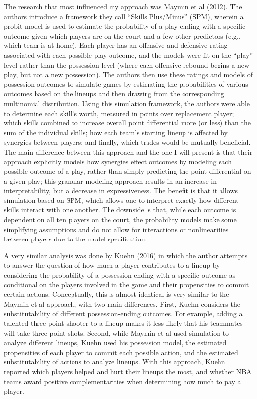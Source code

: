 The research that most influenced my approach was Maymin et al (2012). The authors
introduce a framework they call ``Skills Plus/Minus'' (SPM), wherein a probit model
is used to estimate the probability of a play ending with a specific outcome given
which players are on the court and a few other predictors (e.g., which team is at
home). Each player has an offensive and defensive rating associated with each
possible play outcome, and the models were fit on the ``play'' level rather than the
possession level (where each offensive rebound begins a new play, but not a new
possession). The authors then use these ratings and models of possession outcomes to
simulate games by estimating the probabilities of various outcomes based on the
lineups and then drawing from the corresponding multinomial distribution. Using this
simulation framework, the authors were able to determine each skill's worth,
measured in points over replacement player; which skills combined to increase
overall point differential more (or less) than the sum of the individual skills; how
each team’s starting lineup is affected by synergies between players; and finally,
which trades would be mutually beneficial. The main difference between this approach
and the one I will present is that their approach explicitly models how synergies
effect outcomes by modeling each possible outcome of a play, rather than simply
predicting the point differential on a given play; this granular modeling approach
results in an increase in interpretability, but a decrease in expressiveness. The
benefit is that it allows simulation based on SPM, which allows one to interpret
exactly how different skills interact with one another. The downside is that, while
each outcome is dependent on all ten players on the court, the probability models
make some simplifying assumptions and do not allow for interactions or
nonlinearities between players due to the model specification.

A very similar analysis was done by Kuehn (2016) in which the author attempts to
answer the question of how much a player contributes to a lineup by considering the
probability of a possession ending with a specific outcome as conditional on the
players involved in the game and their propensities to commit certain actions.
Conceptually, this is almost identical is very similar to the Maymin et al approach,
with two main differences. First, Kuehn considers the substitutability of different
possession-ending outcomes. For example, adding a talented three-point shooter to a
lineup makes it less likely that his teammates will take three-point shots. Second,
while Maymin et al used simulation to analyze different lineups, Kuehn used his
possession model, the estimated propensities of each player to commit each possible
action, and the estimated substitutability of actions to analyze lineups. With this
approach, Kuehn reported which players helped and hurt their lineups the most, and
whether NBA teams award positive complementarities when determining how much to pay
a player.

